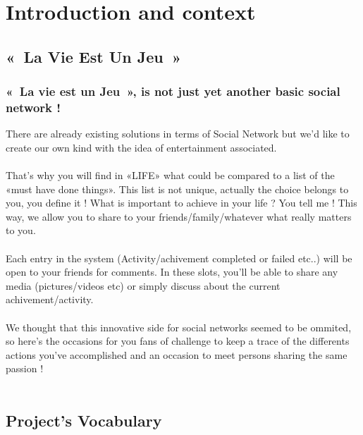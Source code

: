 \documentclass{life-en}
\begin{document}
\newpage

\tableofcontents


\chapter{Introduction and context}

\section{«~La Vie Est Un Jeu~»}

\subsection{«~La vie est un Jeu~», is not just yet another basic social network !}

There are already existing solutions in terms of Social Network but we'd like to create our own kind with the idea of entertainment associated. \\
\\
That's why you will find in «LIFE» what could be compared to a list of the «must have done things». This list is not unique, actually the choice belongs to you, you define it ! What is important to achieve in your life ? You tell me ! This way, we allow you to share to your friends/family/whatever what really matters to you.\\
\\
Each entry in the system (Activity/achivement completed or failed etc..) will be open to your friends for comments. In these slots, you'll be able to share any
media (pictures/videos etc) or simply discuss about the current achivement/activity.\\
\\
We thought that this innovative side for social networks seemed to be ommited, so here's the occasions for you fans of challenge to keep a trace of the differents actions you've accomplished and an occasion to meet persons sharing the same passion !\\
\\


\section{Project's Vocabulary}
\end{document}
